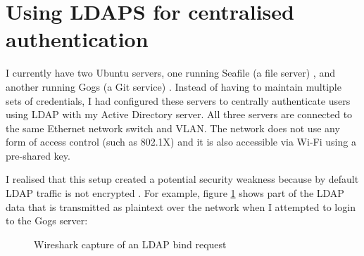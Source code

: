 \documentclass[11pt,a4paper]{scrartcl}
\begin{document}
\newpage

\section*{Using LDAPS for centralised authentication}
\begin{refsection}

I currently have two Ubuntu servers, one running Seafile (a file server) \cite{seafile}, and another running Gogs (a Git service) \cite{gogs}. Instead of having to maintain multiple sets of credentials, I had configured these servers to centrally authenticate users using LDAP \cite{RFC4510} with my Active Directory server. All three servers are connected to the same Ethernet network switch and VLAN. The network does not use any form of access control (such as 802.1X) and it is also accessible via Wi-Fi using a pre-shared key.

I realised that this setup created a potential security weakness because by default LDAP traffic is not encrypted \cite[sec 6.1]{RFC4513} \cite{microsoft_enable_ldaps}. For example, figure \ref{fig:wireshark_ldap} shows part of the LDAP data that is transmitted as plaintext over the network when I attempted to login to the Gogs server:

\begin{figure}[h]
	\centering
	\qquad
	\caption{Wireshark capture of an LDAP bind request}
	\label{fig:wireshark_ldap}
\end{figure}


\end{refsection}
\end{document}
